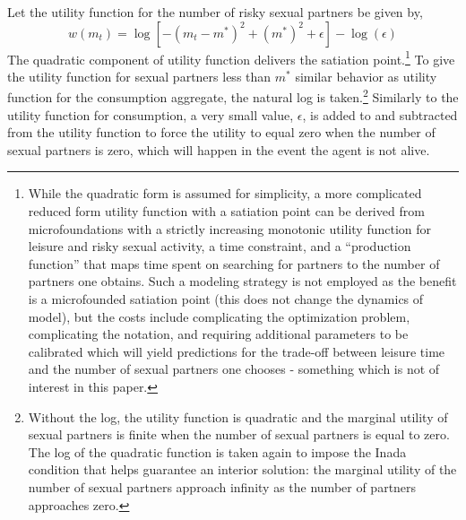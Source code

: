 \documentclass[12pt]{article}
\newcommand{\beq}{\begin{equation}}
\newcommand{\eeq}{\end{equation}}
\begin{document}
Let the utility function for the number of risky sexual partners be given by,
\beq \label{eq:utilsex} w(m_t) = \log\left[-\left(m_t - m^*\right)^2 + \left(m^*\right)^2 + \epsilon\right] - \log(\epsilon) \eeq
The quadratic component of utility function delivers the satiation point.\footnote{While the quadratic form is assumed for simplicity, a more complicated reduced form utility function with a satiation point can be derived from microfoundations with a strictly increasing monotonic utility function for leisure and risky sexual activity, a time constraint, and a ``production function'' that maps time spent on searching for partners to the number of partners one obtains.  Such a modeling strategy is not employed as the benefit is a microfounded satiation point (this does not change the dynamics of model), but the costs include complicating the optimization problem, complicating the notation, and requiring additional parameters to be calibrated which will yield predictions for the trade-off between leisure time and the number of sexual partners one chooses - something which is not of interest in this paper.}  To give the utility function for sexual partners less than $m^*$ similar behavior as utility function for the consumption aggregate, the natural log is taken.\footnote{Without the log, the utility function is quadratic and the marginal utility of sexual partners is finite when the number of sexual partners is equal to zero.  The log of the quadratic function is taken again to impose the Inada condition that helps guarantee an interior solution: the marginal utility of the number of sexual partners approach infinity as the number of partners approaches zero.} Similarly to the utility function for consumption, a very small value, $\epsilon$, is added to and subtracted from the utility function to force the utility to equal zero when the number of sexual partners is zero, which will happen in the event the agent is not alive.
\end{document}
